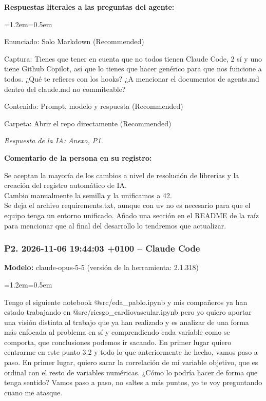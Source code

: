 \documentclass[11pt,a4paper]{article}
\newenvironment{prompt}
  {\par\smallskip\begin{list}{}{\leftmargin=1.2em\rightmargin=0.5em}\item\relax\small\color{black!80}}
  {\end{list}\smallskip}
\begin{document}
\textbf{Respuestas literales a las preguntas del agente:}

\begin{prompt}
Enunciado: Solo Markdown (Recommended)

Captura: Tienes que tener en cuenta que no todos tienen Claude Code, 2 sí y uno tiene Github Copilot, así que lo tienes que hacer genérico para que nos funcione a todos. ¿Qué te refieres con los hooks? ¿A mencionar el documentos de agents.md dentro del claude.md no commiteable?

Contenido: Prompt, modelo y respuesta (Recommended)

Carpeta: Abrir el repo directamente (Recommended)
\end{prompt}

\textit{Respuesta de la IA: Anexo, P1.}

\textbf{Comentario de la persona en su registro:}

Se aceptan la mayoría de los cambios a nivel de resolución de librerías y la creación del registro automático de IA. \\{}
Cambio manualmente la semilla y la unificamos a 42. \\{}
Se deja el archivo requirements.txt, aunque con uv no es necesario para que el equipo tenga un entorno unificado. Añado una sección en el README de la raíz para mencionar que al final del desarrollo lo tendremos que actualizar.

\subsubsection*{P2. 2026-11-06 19:44:03 +0100 -- Claude Code}
\textbf{Modelo:} claude-opus-5-5 (versión de la herramienta: 2.1.318)

\begin{prompt}
Tengo el siguiente notebook @src/\allowbreak{}eda\_\allowbreak{}pablo.ipynb  y mis compañeros ya han estado trabajando en @src/\allowbreak{}riesgo\_\allowbreak{}cardiovascular.ipynb  pero yo quiero aportar una visión distinta al trabajo que ya han realizado y es analizar de una forma más enfocada al problema en sí y comprendiendo cada variable como se comporta, que conclusiones podemos ir sacando. En primer lugar quiero centrarme en este punto 3.2 y todo lo que anteriormente he hecho, vamos paso a paso. En primer lugar, quiero sacar la correlación de mi variable objetivo, que es ordinal con el resto de variables numéricas. ¿Cómo lo podría hacer de forma que tenga sentido? Vamos paso a paso, no saltes a más puntos, yo te voy preguntando cuano me atasque.
\end{prompt}
\end{document}
